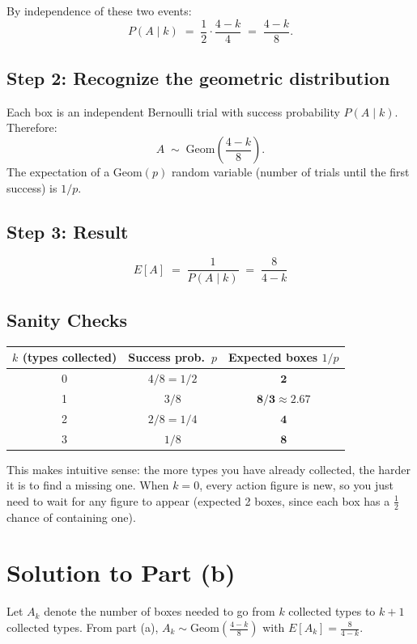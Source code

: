 \documentclass[11pt]{article}
\begin{document}
By independence of these two events:
\[
    P(A \mid k) \;=\; \frac{1}{2} \cdot \frac{4-k}{4} \;=\; \frac{4-k}{8}.
\]

\subsection*{Step 2: Recognize the geometric distribution}

Each box is an independent Bernoulli trial with success probability $P(A \mid k)$. Therefore:
\[
    A \;\sim\; \text{Geom}\!\left(\frac{4-k}{8}\right).
\]
The expectation of a $\text{Geom}(p)$ random variable (number of trials until the first success) is $1/p$.

\subsection*{Step 3: Result}

\[
    \boxed{\; E[A] \;=\; \frac{1}{P(A \mid k)} \;=\; \frac{8}{4-k} \;}
\]

\subsection*{Sanity Checks}

\begin{center}
\begin{tabular}{@{}ccc@{}}
\toprule
$k$ (types collected) & Success prob.\ $p$ & Expected boxes $1/p$ \\
\midrule
0 & $4/8 = 1/2$ & $\mathbf{2}$ \\
1 & $3/8$ & $\mathbf{8/3 \approx 2.67}$ \\
2 & $2/8 = 1/4$ & $\mathbf{4}$ \\
3 & $1/8$ & $\mathbf{8}$ \\
\bottomrule
\end{tabular}
\end{center}

This makes intuitive sense: the more types you have already collected, the harder it is to find a missing one. When $k = 0$, every action figure is new, so you just need to wait for any figure to appear (expected 2 boxes, since each box has a $\tfrac{1}{2}$ chance of containing one).

\section*{Solution to Part (b)}

Let $A_k$ denote the number of boxes needed to go from $k$ collected types to $k+1$ collected types. From part (a), $A_k \sim \text{Geom}\!\left(\tfrac{4-k}{8}\right)$ with $E[A_k] = \tfrac{8}{4-k}$.
\end{document}
